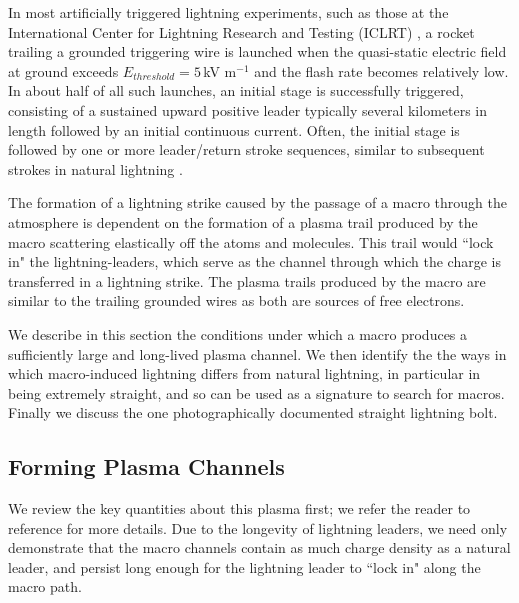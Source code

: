 \documentclass[%
 reprint,
 amsmath,amssymb,
 aps,
]{revtex4-2}
\newcommand{\vtwo}[1]{{\color{black} #1}}
\newcommand{\vfour}[1]{{\color{red} #1}}
\begin{document}
    In most artificially triggered lightning experiments, such as those at the International Center for Lightning Research and Testing (ICLRT) \vtwo{\citep{Hill2012, Hill2013}}, a rocket trailing a grounded triggering wire is launched when the quasi-static electric field at ground exceeds $E_{threshold} = 5\,$kV m$^{-1}$ and the flash rate becomes relatively low. In about half of all such launches, an initial stage is successfully triggered, consisting of a sustained upward positive leader typically several kilometers in length followed by an initial continuous current. Often, the initial stage is followed by one or more leader/return stroke sequences, similar to subsequent strokes in natural lightning \vtwo{\citep{Wang1999, rocket2012}}. 

    The formation of a lightning strike caused by the passage of a macro through the atmosphere is dependent on the formation of a plasma trail produced by the macro scattering elastically off the atoms and molecules. This trail would \vfour{``lock in" the lightning-leaders, which serve} as the channel through which the charge is transferred in a lightning strike. The plasma trails produced by the macro are similar to the trailing grounded wires as both are sources of free electrons.

    We describe in this section the conditions under which a macro produces a sufficiently large and long-lived plasma channel. We then identify the the ways in which macro-induced lightning differs from natural lightning, in particular in being extremely straight, and so can be used as a signature to search for macros. Finally we discuss the one photographically documented straight lightning bolt.

    \subsection{Forming Plasma Channels} %
    \label{sub:macro_induced_plasma_channels}

        We review the key quantities about this plasma first; we refer the reader to reference \vtwo{\citep{Sidhu2018auv}} for more details. \vtwo{Due to the longevity of lightning leaders, we need only demonstrate that the macro channels contain as much charge density as a natural leader, and persist long enough for the lightning leader to ``lock in" along the macro path.} 
\end{document}
